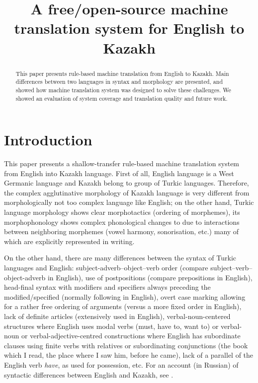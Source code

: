 \documentclass[11pt]{article}
\title{A free/open-source machine translation system for English to Kazakh}
\date{}
\begin{document}
\maketitle 

\begin{abstract}
This paper presents rule-based machine translation from English to Kazakh. Main differences 
between two languages in syntax and morphology are presented, and showed how machine translation 
system was designed to solve these challenges. We showed an evaluation of system coverage and 
translation quality and future work.
\end{abstract}

\section{Introduction}

This paper presents a shallow-transfer rule-based machine translation system from English 
into Kazakh language. First of all, English language is a West Germanic language and Kazakh 
belong to group of Turkic languages. Therefore, the complex agglutinative morphology of Kazakh 
language is very different from morphologically not too complex language like English; on the other 
hand, Turkic language morphology shows clear morphotactics (ordering of morphemes), its morphophonology 
shows complex phonological changes to due to interactions between neighboring morphemes (vowel harmony, 
sonorisation, etc.) many of which are explicitly represented in writing.

On the other hand, there are many differences between the syntax of Turkic languages 
and English: subject-adverb–object–verb order (compare subject–verb–object-adverb in English), use of 
postpositions (compare prepositions in English), head-final syntax with modifiers and specifiers 
always preceding the modified/specified (normally following in English), overt case marking allowing 
for a rather free ordering of arguments (versus a more fixed order in English), lack of definite 
articles (extensively used in English), verbal-noun-centered structures where English uses modal 
verbs (must, have to, want to) or verbal-noun or verbal-adjective-centred constructions where 
English has subordinate clauses using finite verbs with relatives or subordinating 
conjunctions (the book which I read, the place where I saw him, before he came), lack of a parallel 
of the English verb \emph{have}, as used for possession, etc. For an account (in Russian) of 
syntactic differences between English and Kazakh, see \cite{pecherskih2012}.
\end{document}
